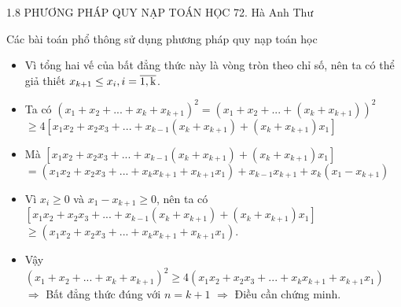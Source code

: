 \begin{frame}{1.8 PHƯƠNG PHÁP QUY NẠP TOÁN HỌC \hspace{2cm}  72. Hà Anh Thư} 
\begin{block}{Các bài toán phổ thông sử dụng phương pháp quy nạp toán học}
\begin{itemize}
    \item Vì tổng hai vế của bất đẳng thức này là vòng tròn theo chỉ số, nên ta có thể giả thiết $x_{k + 1} \le x_i, i = \overline{\rm 1, k}$.
    \pause
    \item Ta có $(x_1 + x_2 + ... + x_k + x_{k + 1})^2 = (x_1 + x_2 + ... + (x_k + x_{k + 1}))^2$ \\
        $\ge 4[x_1x_2 + x_2x_3 + ... + x_{k - 1}(x_k + x_{k + 1}) + (x_k + x_{k + 1})x_1]$
    \pause
    \item Mà $[x_1x_2 + x_2x_3 + ... + x_{k - 1}(x_k + x_{k + 1}) + (x_k + x_{k + 1})x_1]$ \\
        $= (x_1x_2 + x_2x_3 + ... + x_kx_{k + 1} + x_{k + 1}x_1) + x_{k - 1}x_{k+1} + x_k(x_1 - x_{k + 1})$ \\
    \pause
    \item Vì $x_i \ge 0$ và $x_1 - x_{k + 1} \ge 0$, nên ta có \\
        $[x_1x_2 + x_2x_3 + ... + x_{k - 1}(x_k + x_{k + 1}) + (x_k + x_{k + 1})x_1]$ \\
        $\ge (x_1x_2 + x_2x_3 + ... + x_kx_{k + 1} + x_{k + 1}x_1)$.
    \pause
    \item Vậy $(x_1 + x_2 + ... + x_k + x_{k + 1})^2 \ge 4(x_1x_2 + x_2x_3 + ... + x_kx_{k + 1} + x_{k + 1}x_1)$
        $\Rightarrow$ Bất đẳng thức đúng với $n = k + 1$ $\Rightarrow$ Điều cần chứng minh.
\end{itemize}
\end{block}
\end{frame}
